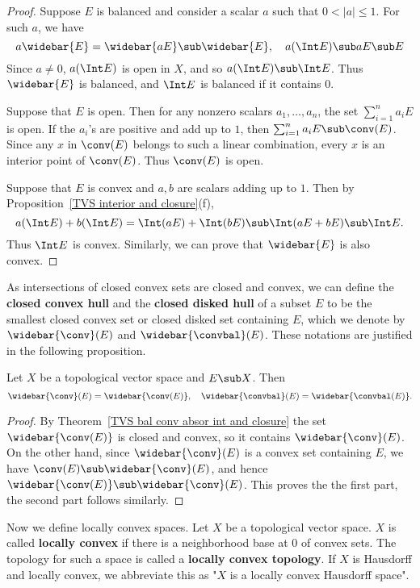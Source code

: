 \begin{proof}
Suppose $E$ is balanced and consider a scalar $a$ such that $0<|a|\leq 1$. For such $a$, we have
\[a\widebar{E}=\widebar{aE}\sub\widebar{E},\quad a(\Int E)\sub aE\sub E\]
Since $a\neq 0$, $a(\Int E)$ is open in $X$, and so $a(\Int E)\sub\Int E$. Thus $\widebar{E}$ is balanced, and $\Int E$ is balanced if it contains $0$.\par
Suppose that $E$ is open. Then for any nonzero scalars $a_1,\dots,a_n$, the set $\sum_{i=1}^{n}a_iE$ is open. If the $a_i$'s are positive and add up to $1$, then $\sum_{i=1}^{n}a_iE\sub\conv(E)$. Since any $x$ in $\conv(E)$ belongs to such a linear combination, every $x$ is an interior point of $\conv(E)$. Thus $\conv(E)$ is open.\par
Suppose that $E$ is convex and $a,b$ are scalars adding up to $1$. Then by Proposition~\ref{TVS interior and closure}(f),
\[a(\Int E)+b(\Int E)=\Int(aE)+\Int(bE)\sub\Int(aE+bE)\sub\Int E.\]
Thus $\Int E$ is convex. Similarly, we can prove that $\widebar{E}$ is also convex.
\end{proof}
As intersections of closed convex sets are closed and convex, we can define the \textbf{closed convex hull} and the \textbf{closed disked hull} of a subset $E$ to be the smallest closed convex set or closed disked set containing $E$, which we denote by $\widebar{\conv}(E)$ and $\widebar{\convbal}(E)$. These notations are justified in the following proposition.
\begin{proposition}\label{TVS closed convex hull char}
Let $X$ be a topological vector space and $E\sub X$. Then
\[\widebar{\conv}(E)=\widebar{\conv(E)},\quad \widebar{\convbal}(E)=\widebar{\convbal(E)}.\]
\end{proposition}
\begin{proof}
By Theorem~\ref{TVS bal conv absor int and closure} the set $\widebar{\conv(E)}$ is closed and convex, so it contains $\widebar{\conv}(E)$. On the other hand, since $\widebar{\conv}(E)$ is a convex set containing $E$, we have $\conv(E)\sub\widebar{\conv}(E)$, and hence $\widebar{\conv(E)}\sub\widebar{\conv}(E)$. This proves the the first part, the second part follows similarly.
\end{proof}
Now we define locally convex spaces. Let $X$ be a topological vector space. $X$ is called \textbf{locally convex} if there is a neighborhood base at $0$ of convex sets. The topology for such a space is called a \textbf{locally convex topology}. If $X$ is Hausdorff and locally convex, we abbreviate this as "$X$ is a locally convex Hausdorff space".\par
